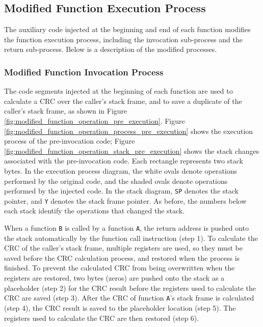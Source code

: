\subsection{Modified Function Execution Process}
\vspace{-5pt}
The auxiliary code injected at the beginning and end of each function modifies the function execution process, including the invocation sub-process and the return sub-process. Below is a description of the modified processes.
\vspace{-15pt}
\subsubsection{Modified Function Invocation Process}
\vspace{-5pt}
The code segments injected at the beginning of each function are used to calculate a CRC over the caller's stack frame, and to save a duplicate of the caller's stack frame, as shown in Figure \ref{fig:modified_function_operation_pre_execution}. Figure \ref{fig:modified_function_operation_process_pre_execution} shows the execution process of the pre-invocation code; Figure \ref{fig:modified_function_operation_stack_pre_execution} shows the stack changes associated with the pre-invocation code. Each rectangle represents two stack bytes. In the execution process diagram, the white ovals denote operations performed by the original code, and the shaded ovals denote operations performed by the injected code. In the stack diagram, \texttt{SP} denotes the stack pointer, and \texttt{Y} denotes the stack frame pointer. As before, the numbers below each stack identify the operations that changed the stack.

When a function \texttt{B} is called by a function \texttt{A}, the return address is pushed onto the stack automatically by the function call instruction (step 1). To calculate the CRC of the caller's stack frame, multiple registers are used, so they must be saved before the CRC calculation process, and restored when the process is finished. To prevent the calculated CRC from being overwritten when the registers are restored, two bytes (zeros) are pushed onto the stack as a placeholder (step 2) for the CRC result before the registers used to calculate the CRC are saved (step 3). After the CRC of function \texttt{A}'s stack frame is calculated (step 4), the CRC result is saved to the placeholder location (step 5). The registers used to calculate the CRC are then restored (step 6).

